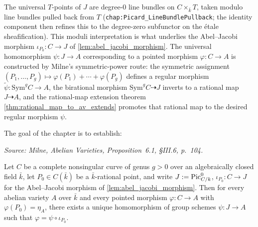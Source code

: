 The universal \(T\)-points of \(J\) are degree-\(0\) line bundles on \(C \times_{\bar k}
T\), taken modulo line bundles pulled back from \(T\) (\texttt{chap:Picard_LineBundlePullback};
the identity component then refines this to the degree-zero subfunctor on the
\'etale sheafification). This moduli interpretation is what underlies the
Abel--Jacobi morphism \(\iota_{P_0} \colon C \to J\) of
\cref{lem:abel_jacobi_morphism}. The universal homomorphism \(\psi \colon J
\to A\) corresponding to a pointed morphism \(\varphi \colon C \to A\) is
constructed by Milne's symmetric-power route: the symmetric assignment
\((P_1, \ldots, P_g) \mapsto \varphi(P_1) + \cdots + \varphi(P_g)\) defines a
regular morphism \(\widetilde \psi \colon \mathrm{Sym}^g C \to A\), the
birational morphism \(\mathrm{Sym}^g C \dashrightarrow J\) inverts to a
rational map \(J \dashrightarrow A\), and the rational-map extension theorem
\cref{thm:rational_map_to_av_extends} promotes that rational map to the
desired regular morphism \(\psi\).

The goal of the chapter is to establish:

\begin{theorem}

  \label{thm:albanese_universal_property}

  \textit{Source: Milne, \emph{Abelian Varieties}, Proposition~6.1, \S III.6, p.~104.}

  Let \(C\) be a complete nonsingular curve of genus \(g > 0\) over an algebraically
  closed field \(\bar k\), let \(P_0 \in C(\bar k)\) be a \(\bar k\)-rational point,
  and write \(J := \operatorname{Pic}^0_{C/k}\), \(\iota_{P_0} \colon C \to J\) for the
  Abel--Jacobi morphism of \cref{lem:abel_jacobi_morphism}. Then for every
  abelian variety \(A\) over \(\bar k\) and every pointed morphism
  \(\varphi \colon C \to A\) with \(\varphi(P_0) = \eta_A\), there exists a unique
  homomorphism of group schemes \(\psi \colon J \to A\) such that
  \(\varphi = \psi \circ \iota_{P_0}\).
\end{theorem}

